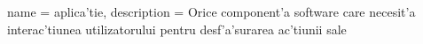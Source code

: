 \makeglossaries

{
  name = {aplica'tie},
  description = {Orice component'a software care necesit'a interac'tiunea utilizatorului pentru desf'a'surarea ac'tiunii sale}
}



